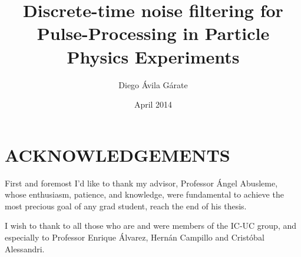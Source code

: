 \documentclass[pucformat]{XPucThesis}
\begin{document}
\version{\today}

\title[TITLE]{\textbf{Discrete-time noise filtering for Pulse-Processing in Particle Physics Experiments}}
\author[AUTOR]{Diego Ávila Gárate}
\address{Escuela de Ingenier\'ia\\
         Pontificia Universidad Cat\'olica de Chile\\ 
         Vicu\~na Mackenna 4860\\
         Santiago, Chile\\
         {\it Tel.\/} : 56 (2) 354-2000}

\advisorB{} %


\subject{Engineering}

\date{April 2014} %


\dedication{\mbox{}}

\NoChapterPageNumber    %

\maketitle

\cleardoublepage


\chapter*{ACKNOWLEDGEMENTS}

First and foremost I'd like to thank my advisor, Professor Ángel Abusleme, whose enthusiasm, patience, and knowledge, were fundamental to achieve the most precious goal of any grad student, reach the end of his thesis. 

I wish to thank to all those who are and were members of the IC-UC group, and especially to Professor Enrique Álvarez, Hernán Campillo and Cristóbal Alessandri.
\end{document}
